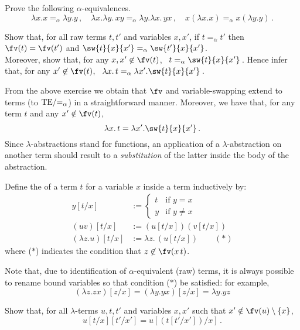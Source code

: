 \documentclass{svmult}
\begin{document}
%
\begin{myexercise}
Prove the following $\alpha$-equivalences.
\[ \lambda x.x=_\alpha\lambda y.y\,,\quad \lambda x.\lambda y.\,xy=_\alpha\lambda y.\lambda x.\,yx\,,\quad x(\lambda x.x)=_\alpha x(\lambda y.y)\,. \]
\end{myexercise}
%
\begin{myexercise}
Show that, for all raw terms $t,t'$ and variables $x,x'$, if $t=_\alpha t'$ then $\fv(t)=\fv(t')$ and $\sw{t}{x}{x'}=_\alpha\sw{t'}{x}{x'}$.  \\
Moreover, show that, for any $x,x'\not\in\fv(t)$, \ $t=_\alpha\sw{t}{x}{x'}$\,. Hence infer that, for any $x'\not\in\fv(t)$, \ $\lambda
x.\,t=_\alpha\lambda x'.\sw{t}{x}{x'}$\,.
\end{myexercise}
%
From the above exercise we obtain that $\fv$ and variable-swapping extend to terms (\ie to $\mathrm{TE}/\mathnormal{=_\alpha}$) in a straightforward manner.
Moreover, we have that, for any term $t$ and any $x'\notin\fv(t)$,
\[ \lambda x.\,t= \lambda x'.\sw{t}{x}{x'}\,. \]
%
Since $\lambda$-abstractions stand for functions, an application of a $\lambda$-abstraction on
another term should result to a \emph{substitution} of the latter inside the body of the abstraction.
%
\begin{mydefinition}
Define the  of a term $t$ for a variable $x$ inside a term inductively by:
\begin{align*}
y[t/x]  &:=\begin{cases}t & \text{if }y=x \\ y & \text{if }y \neq x\end{cases} \\
(uv)[t/x] &:= (u[t/x])(v[t/x]) \\
(\lambda z. u) [t/x] &:= \lambda z.\, (u[t/x]) \qquad (\ast )
\end{align*}
where  ($*$) indicates the condition that  $z\not\in\fv(x\,t)$.\deq
\end{mydefinition}
Note that, due to identification of $\alpha$-equivalent (raw) terms, it is always possible to rename bound variables so that condition ($*$) be satisfied: for example,
\[ (\lambda z. zx) [z/x] = (\lambda y. yx) [z/x] = \lambda y. yz \]
\begin{myexercise}\label{ex:SubSub}
Show that, for all $\lambda$-terms $u,t,t'$ and variables $x,x'$ such that $x'\notin\fv(u)\setminus\{x\}$,
    \[ u[t/x][t'/x'] = u[(t[t'/x'])/x]\,. \]
\end{myexercise}
%
\end{document}
